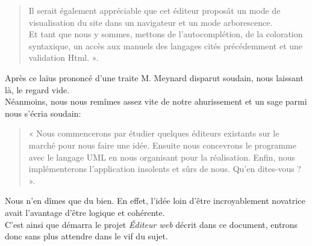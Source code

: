 \documentclass[a4paper, 12pt]{report}
\begin{document}
\begin{chapter}
\begin{quotation}
		Il serait également appréciable que cet éditeur proposât un mode de visualisation du site dans un navigateur et un mode arborescence.\\

		Et tant que nous y sommes, mettons de l'\gls{autocomplétion}, de la coloration syntaxique, un accès aux manuels
		des langages cités précédemment et une validation Html. ».
	\end{quotation}

	Après ce laïus prononcé d'une traite M. Meynard disparut soudain, nous laissant là, le regard vide.\\


	Néanmoins, nous nous remîmes assez vite de notre ahurissement et un sage parmi nous s'écria soudain:
	\begin{quotation}
		« Nous commencerons par étudier quelques éditeurs existants sur le marché pour nous faire une idée. Ensuite nous concevrons
		le programme avec le langage UML en nous organisant pour la réalisation.
		Enfin, nous implémenterons l'application insolents et sûrs de nous.	Qu'en dites-vous ? ».
	\end{quotation}

	Nous n'en dîmes que du bien. En effet, l'idée loin d'être incroyablement novatrice avait l'avantage d'être logique et cohérente.\\


	C'est ainsi que démarra le projet \emph{Éditeur web} décrit dans ce document, entrons donc sans plus attendre dans le vif du sujet.
	
	\end{chapter}
\end{document}
